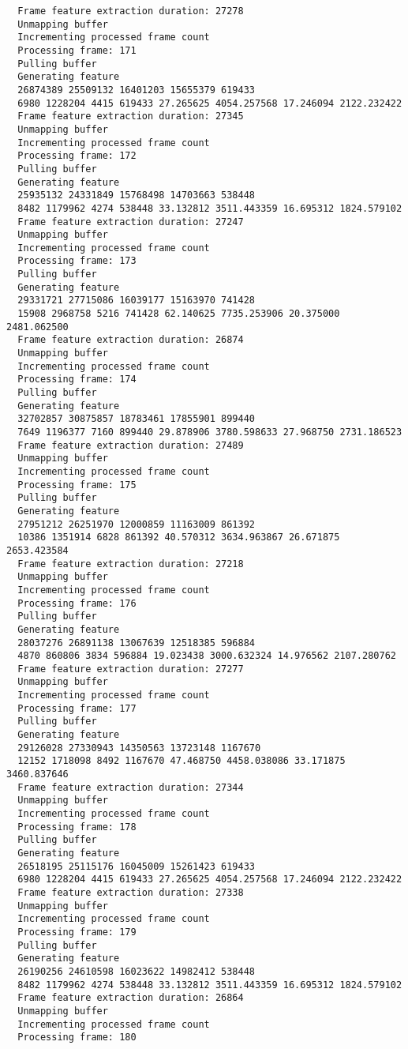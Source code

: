 \documentclass[12pt,oneside]{book}
\begin{document}
\begin{lstlisting}
  Frame feature extraction duration: 27278
  Unmapping buffer
  Incrementing processed frame count
  Processing frame: 171
  Pulling buffer
  Generating feature
  26874389 25509132 16401203 15655379 619433
  6980 1228204 4415 619433 27.265625 4054.257568 17.246094 2122.232422
  Frame feature extraction duration: 27345
  Unmapping buffer
  Incrementing processed frame count
  Processing frame: 172
  Pulling buffer
  Generating feature
  25935132 24331849 15768498 14703663 538448
  8482 1179962 4274 538448 33.132812 3511.443359 16.695312 1824.579102
  Frame feature extraction duration: 27247
  Unmapping buffer
  Incrementing processed frame count
  Processing frame: 173
  Pulling buffer
  Generating feature
  29331721 27715086 16039177 15163970 741428
  15908 2968758 5216 741428 62.140625 7735.253906 20.375000 2481.062500
  Frame feature extraction duration: 26874
  Unmapping buffer
  Incrementing processed frame count
  Processing frame: 174
  Pulling buffer
  Generating feature
  32702857 30875857 18783461 17855901 899440
  7649 1196377 7160 899440 29.878906 3780.598633 27.968750 2731.186523
  Frame feature extraction duration: 27489
  Unmapping buffer
  Incrementing processed frame count
  Processing frame: 175
  Pulling buffer
  Generating feature
  27951212 26251970 12000859 11163009 861392
  10386 1351914 6828 861392 40.570312 3634.963867 26.671875 2653.423584
  Frame feature extraction duration: 27218
  Unmapping buffer
  Incrementing processed frame count
  Processing frame: 176
  Pulling buffer
  Generating feature
  28037276 26891138 13067639 12518385 596884
  4870 860806 3834 596884 19.023438 3000.632324 14.976562 2107.280762
  Frame feature extraction duration: 27277
  Unmapping buffer
  Incrementing processed frame count
  Processing frame: 177
  Pulling buffer
  Generating feature
  29126028 27330943 14350563 13723148 1167670
  12152 1718098 8492 1167670 47.468750 4458.038086 33.171875 3460.837646
  Frame feature extraction duration: 27344
  Unmapping buffer
  Incrementing processed frame count
  Processing frame: 178
  Pulling buffer
  Generating feature
  26518195 25115176 16045009 15261423 619433
  6980 1228204 4415 619433 27.265625 4054.257568 17.246094 2122.232422
  Frame feature extraction duration: 27338
  Unmapping buffer
  Incrementing processed frame count
  Processing frame: 179
  Pulling buffer
  Generating feature
  26190256 24610598 16023622 14982412 538448
  8482 1179962 4274 538448 33.132812 3511.443359 16.695312 1824.579102
  Frame feature extraction duration: 26864
  Unmapping buffer
  Incrementing processed frame count
  Processing frame: 180

\end{lstlisting}
\end{document}
